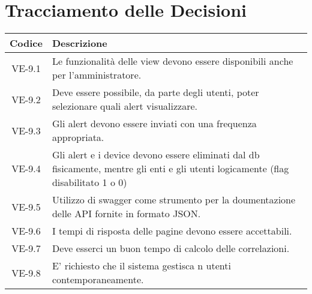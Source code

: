 \section*{Tracciamento delle Decisioni}

\begin{center}
	\begin{longtable}{|c|p{14.5cm}|}
	\hline
	\rowcolor{lighter-grayer}
	\textbf{Codice} & \textbf{Descrizione} \\
	\hline
	\endfirsthead
	
	\hline
	VE-9.1 & Le funzionalità delle view devono essere disponibili anche per l'amministratore. \\
	\hline
	VE-9.2 & Deve essere possibile, da parte degli utenti, poter selezionare quali alert visualizzare. \\
	\hline
	VE-9.3 & Gli alert devono essere inviati con una frequenza appropriata. \\
	\hline
	VE-9.4 & Gli alert e i device devono essere eliminati dal db fisicamente, mentre gli enti e gli utenti logicamente (flag disabilitato 1 o 0) \\
	\hline
	VE-9.5 & Utilizzo di swagger come strumento per la doumentazione delle API fornite in formato JSON. \\
	\hline
	VE-9.6 & I tempi di risposta delle pagine devono essere accettabili. \\
	\hline
	VE-9.7 & Deve esserci un buon tempo di calcolo delle correlazioni. \\
	\hline
	VE-9.8 & E' richiesto che il sistema gestisca n utenti contemporaneamente. \\
	\hline
	\end{longtable}
\end{center}
